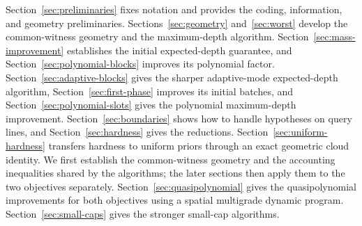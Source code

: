 Section~\ref{sec:preliminaries} fixes notation and provides the
coding, information, and geometry preliminaries.
Sections~\ref{sec:geometry} and~\ref{sec:worst} develop the
common-witness geometry and the maximum-depth algorithm.
Section~\ref{sec:mass-improvement}
establishes the initial expected-depth guarantee, and
Section~\ref{sec:polynomial-blocks} improves its polynomial factor.
Section~\ref{sec:adaptive-blocks} gives the sharper adaptive-mode
expected-depth algorithm, Section~\ref{sec:first-phase}
improves its initial batches, and Section~\ref{sec:polynomial-slots}
gives the polynomial maximum-depth improvement.
Section~\ref{sec:boundaries}
shows how to handle hypotheses on query lines, and
Section~\ref{sec:hardness} gives the reductions.
Section~\ref{sec:uniform-hardness} transfers hardness to uniform priors
through an exact geometric cloud identity. We first establish
the common-witness geometry and the accounting inequalities shared
by the algorithms; the later sections then apply them to the two
objectives separately. Section~\ref{sec:quasipolynomial} gives the
quasipolynomial improvements for both objectives using a spatial
multigrade dynamic program.
Section~\ref{sec:small-caps} gives the stronger small-cap algorithms.
